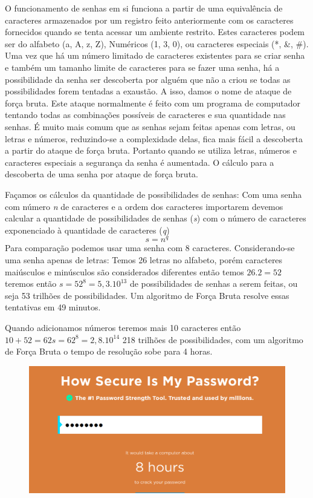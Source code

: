 O funcionamento de senhas em si funciona a partir de uma equivalência de caracteres armazenados por um registro feito anteriormente com os caracteres fornecidos quando se tenta acessar um ambiente restrito. Estes caracteres podem ser do alfabeto (a, A, z, Z), Numéricos (1, 3, 0), ou caracteres especiais (*, \&, \#). Uma vez que há um número limitado de caracteres existentes para se criar senha e também um tamanho limite de caracteres para se fazer uma senha, há a possibilidade da senha ser descoberta por alguém que não a criou se todas as possibilidades forem tentadas a exaustão. A isso, damos o nome de ataque de força bruta. Este ataque normalmente é feito com um programa de computador tentando todas as combinações possíveis de caracteres e sua quantidade nas senhas. É muito mais comum que as senhas sejam feitas apenas com letras, ou letras e números, reduzindo-se a complexidade delas, fica mais fácil a descoberta a partir do ataque de força bruta. Portanto quando se utiliza letras, números e caracteres especiais a segurança da senha é aumentada. O cálculo para a descoberta de uma senha por ataque de força bruta.

Façamos os cálculos da quantidade de possibilidades de senhas:
Com uma senha com número \textit{n} de caracteres e a ordem dos caracteres importarem devemos calcular a quantidade de possibilidades de senhas (\textit{s}) com o número de caracteres exponenciado à quantidade de caracteres (\textit{q})
\[s = n ^q\]
Para comparação podemos usar uma senha com 8 caracteres.
Considerando-se uma senha apenas de letras: Temos 26 letras no alfabeto, porém caracteres maiúsculos e minúsculos são considerados diferentes então temos \(26 . 2 = 52 \) teremos então \(s = 52^8 = 5,3 . 10^{13} \) de possibilidades de senhas a serem feitas, ou seja 53 trilhões de possibilidades. Um algoritmo de Força Bruta resolve essas tentativas em 49 minutos.

Quando adicionamos números teremos mais 10 caracteres então \( 10 + 52 = 62 s = 62^8 = 2,8 . 10^{14} \) 218 trilhões de possibilidades, com um algoritmo de Força Bruta o tempo de resolução sobe para 4 horas.

\begin{figure}[h]
\centering
\includegraphics[width=\textwidth]{img/tempo_decifrar_senha.png}
\end{figure}


